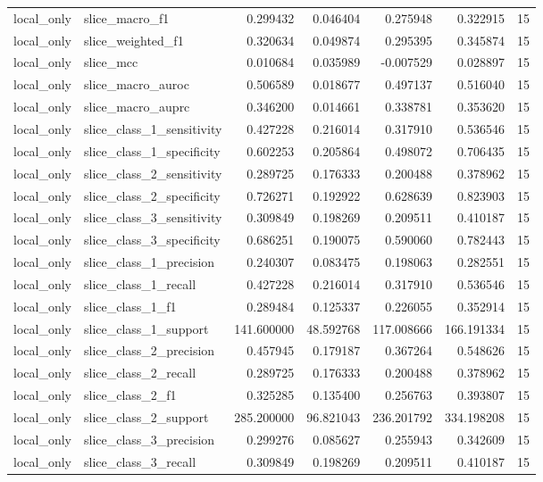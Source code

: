 \begin{tabular}{llrrrrr}
local_only & slice_macro_f1 & 0.299432 & 0.046404 & 0.275948 & 0.322915 & 15 \\
local_only & slice_weighted_f1 & 0.320634 & 0.049874 & 0.295395 & 0.345874 & 15 \\
local_only & slice_mcc & 0.010684 & 0.035989 & -0.007529 & 0.028897 & 15 \\
local_only & slice_macro_auroc & 0.506589 & 0.018677 & 0.497137 & 0.516040 & 15 \\
local_only & slice_macro_auprc & 0.346200 & 0.014661 & 0.338781 & 0.353620 & 15 \\
local_only & slice_class_1_sensitivity & 0.427228 & 0.216014 & 0.317910 & 0.536546 & 15 \\
local_only & slice_class_1_specificity & 0.602253 & 0.205864 & 0.498072 & 0.706435 & 15 \\
local_only & slice_class_2_sensitivity & 0.289725 & 0.176333 & 0.200488 & 0.378962 & 15 \\
local_only & slice_class_2_specificity & 0.726271 & 0.192922 & 0.628639 & 0.823903 & 15 \\
local_only & slice_class_3_sensitivity & 0.309849 & 0.198269 & 0.209511 & 0.410187 & 15 \\
local_only & slice_class_3_specificity & 0.686251 & 0.190075 & 0.590060 & 0.782443 & 15 \\
local_only & slice_class_1_precision & 0.240307 & 0.083475 & 0.198063 & 0.282551 & 15 \\
local_only & slice_class_1_recall & 0.427228 & 0.216014 & 0.317910 & 0.536546 & 15 \\
local_only & slice_class_1_f1 & 0.289484 & 0.125337 & 0.226055 & 0.352914 & 15 \\
local_only & slice_class_1_support & 141.600000 & 48.592768 & 117.008666 & 166.191334 & 15 \\
local_only & slice_class_2_precision & 0.457945 & 0.179187 & 0.367264 & 0.548626 & 15 \\
local_only & slice_class_2_recall & 0.289725 & 0.176333 & 0.200488 & 0.378962 & 15 \\
local_only & slice_class_2_f1 & 0.325285 & 0.135400 & 0.256763 & 0.393807 & 15 \\
local_only & slice_class_2_support & 285.200000 & 96.821043 & 236.201792 & 334.198208 & 15 \\
local_only & slice_class_3_precision & 0.299276 & 0.085627 & 0.255943 & 0.342609 & 15 \\
local_only & slice_class_3_recall & 0.309849 & 0.198269 & 0.209511 & 0.410187 & 15 \\

\end{tabular}
